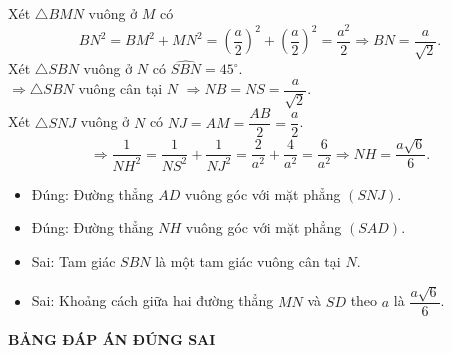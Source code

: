 \begin{ex}
{{\begin{tikzpicture}[scale=0.9, font=\footnotesize, line join=round, line cap=round, >=stealth]
			\end{tikzpicture}
		}
		\noindent
		Xét $\triangle BMN$ vuông ở $M$ có
		$$BN^2=BM^2+MN^2=\left(\dfrac{a}{2}\right)^2+\left(\dfrac{a}{2}\right)^2=\dfrac{a^2}{2} \Rightarrow BN=\dfrac{a}{\sqrt{2}}.$$
		Xét $\triangle SBN$ vuông ở $N$ có $\widehat{SBN}=45^\circ$.\\
		$\Rightarrow \triangle SBN$ vuông cân tại $N$ $\Rightarrow NB=NS=\dfrac{a}{\sqrt{2}}$.\\
		Xét $\triangle SNJ$ vuông ở $N$ có $NJ=AM=\dfrac{AB}{2}=\dfrac{a}{2}$.
		$$\Rightarrow \dfrac{1}{NH^2}=\dfrac{1}{NS^2}+\dfrac{1}{NJ^2}=\dfrac{2}{a^2}+\dfrac{4}{a^2}=\dfrac{6}{a^2} \Rightarrow NH=\dfrac{a\sqrt{6}}{6}.$$
		\begin{itemize}
			\item Đúng: Đường thẳng $AD$ vuông góc với mặt phẳng $(SNJ)$.
			\item Đúng: Đường thẳng $NH$ vuông góc với mặt phẳng $(SAD)$.
			\item Sai: Tam giác $SBN$ là một tam giác vuông cân tại $N$.
			\item Sai: Khoảng cách giữa hai đường thẳng $MN$ và $SD$ theo $a$ là $\dfrac{a\sqrt{6}}{6}$.
		\end{itemize}
	}
\end{ex}


\begin{center}
	\textbf{\textsf{BẢNG ĐÁP ÁN ĐÚNG SAI}}
\end{center}


%
